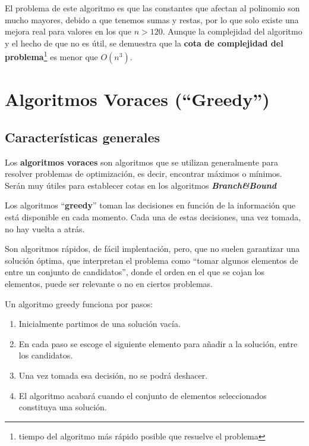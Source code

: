 \documentclass[10pt,a4paper,spanish]{report}
\theoremstyle{definition}
\theoremstyle{remark}
\begin{document}
El problema de este algoritmo es que las constantes que afectan al polinomio son mucho mayores, debido a que tenemos sumas y restas, por lo que solo existe una mejora real para valores en los que $n>120$. Aunque la complejidad del algoritmo y el hecho de que no es útil, se demuestra que la \textbf{\textcolor[rgb]{0.2,0.5,0.5}{cota de complejidad del problema}}\footnote{tiempo del algoritmo más rápido posible que resuelve el problema} es menor que $O(n^3)$.

\chapter{\textcolor{electriccrimson}Algoritmos Voraces (``Greedy'')}

\section{\textcolor{electriccrimson}Características generales}

Los \textbf{\textcolor{electriccrimson}{algoritmos voraces}} son algoritmos que se utilizan generalmente para resolver problemas de optimización, es decir, encontrar máximos o mínimos. Serán muy útiles para establecer cotas en los algoritmos \textit{\textbf{\textcolor{electriccrimson}{Branch\&Bound}}}

Los algoritmos ``\textbf{\textcolor{electriccrimson}{greedy}}'' toman las decisiones en función de la información que está disponible en cada momento. Cada una de estas decisiones, una vez tomada, no hay vuelta a atrás.

Son algoritmos rápidos, de fácil implentación, pero, que no suelen garantizar una solución óptima, que interpretan el problema como ``tomar algunos elementos de entre un conjunto de candidatos'', donde el orden en el que se cojan los elementos, puede ser relevante o no en ciertos problemas.

Un algoritmo greedy funciona por pasos:
    \begin{enumerate}[---]
        \item Inicialmente partimos de una solución vacía.
        \item En cada paso se escoge el siguiente elemento para añadir a la solución, entre los candidatos.
        \item Una vez tomada esa decisión, no se podrá deshacer.
        \item El algoritmo acabará cuando el conjunto de elementos seleccionados constituya una solución.
    \end{enumerate}
\end{document}
